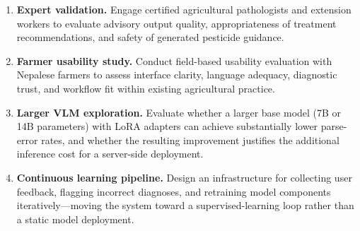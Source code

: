 
\begin{enumerate}[label=\arabic*.]
\item \textbf{Expert validation.} Engage certified agricultural pathologists and extension
workers to evaluate advisory output quality, appropriateness of treatment recommendations, and
safety of generated pesticide guidance.

\item \textbf{Farmer usability study.} Conduct field-based usability evaluation with Nepalese
farmers to assess interface clarity, language adequacy, diagnostic trust, and workflow fit
within existing agricultural practice.

\item \textbf{Larger VLM exploration.} Evaluate whether a larger base model (7B or 14B
parameters) with LoRA adapters can achieve substantially lower parse-error rates, and whether
the resulting improvement justifies the additional inference cost for a server-side deployment.

\item \textbf{Continuous learning pipeline.} Design an infrastructure for collecting user
feedback, flagging incorrect diagnoses, and retraining model components iteratively---moving
the system toward a supervised-learning loop rather than a static model deployment.
\end{enumerate}
